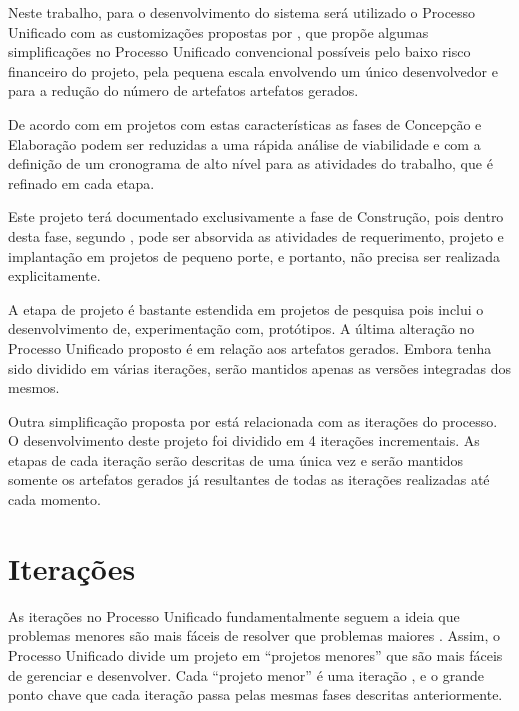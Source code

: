 Neste trabalho, para o desenvolvimento do sistema será utilizado o Processo Unificado com as customizações propostas por , que propõe algumas simplificações no Processo Unificado convencional possíveis pelo baixo risco financeiro do projeto, pela pequena escala envolvendo um único desenvolvedor e para a redução do número de artefatos artefatos gerados.

De acordo com  em projetos com estas características as fases de Concepção e Elaboração podem ser reduzidas a uma rápida análise de viabilidade e com a definição de um cronograma de alto nível para as atividades do trabalho, que é refinado em cada etapa.

Este projeto terá documentado exclusivamente a fase de Construção, pois dentro desta fase, segundo , pode ser absorvida as atividades de requerimento, projeto e implantação em projetos de pequeno porte, e portanto, não precisa ser realizada explicitamente.

A etapa de projeto é bastante estendida em projetos de pesquisa pois inclui o desenvolvimento de, experimentação com, protótipos. A última alteração no Processo Unificado proposto é em relação aos artefatos gerados. Embora tenha sido dividido em várias iterações, serão mantidos apenas as versões integradas dos mesmos.

Outra simplificação proposta por  está relacionada com as iterações do processo. O desenvolvimento deste projeto foi dividido em 4 iterações incrementais. As etapas de cada iteração serão descritas de uma única vez e serão mantidos somente os artefatos gerados já resultantes de todas as iterações realizadas até cada momento.


\section{Iterações}

As iterações no Processo Unificado fundamentalmente seguem a ideia que problemas menores são mais fáceis de resolver que problemas maiores \cite{arlow:2002}. Assim, o Processo Unificado divide um projeto em ``projetos menores'' que são mais fáceis de gerenciar e desenvolver. Cada ``projeto menor'' é uma iteração \cite{arlow:2002}, e o grande ponto chave que cada iteração passa pelas mesmas fases descritas anteriormente.


